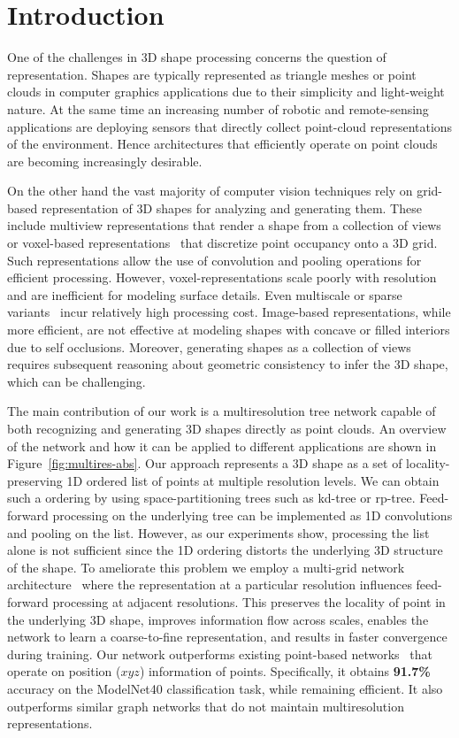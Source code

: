 \section{Introduction}
One of the challenges in 3D shape processing concerns the question of representation.
Shapes are typically represented as triangle meshes or point clouds in computer graphics applications due to their simplicity and light-weight nature.
At the same time an increasing number of robotic and remote-sensing applications are deploying sensors that directly collect point-cloud representations of the environment. Hence architectures that efficiently operate on point clouds are becoming increasingly desirable.

On the other hand the vast majority of computer vision techniques rely on grid-based representation of 3D shapes for analyzing and generating them. 
These include multiview representations that render a shape from a collection of views~\cite{qi2016volumetric,mvcnn,Soltani17} or voxel-based representations~\cite{wu20153d,Huang:PCL,voxnet,BrockLRW16,3dgan} that discretize point occupancy onto a 3D grid. 
Such representations allow the use of convolution and pooling operations for efficient processing. 
However, voxel-representations scale poorly with resolution and are inefficient for modeling surface details.
Even multiscale or sparse variants~\cite{fpnn,Riegler2017CVPR,hie3dcnn} incur relatively high processing cost.
Image-based representations, while more efficient, are not effective at modeling shapes with concave or filled interiors due to self occlusions.
Moreover, generating shapes as a collection of views requires subsequent reasoning about geometric consistency to infer the 3D shape, which can be challenging.


The main contribution of our work is a multiresolution tree network capable of both recognizing and generating 3D shapes directly as point clouds.
An overview of the network and how it can be applied to different applications are shown in Figure~\ref{fig:multires-abs}.
Our approach represents a 3D shape as a set of locality-preserving 1D ordered list of points at multiple resolution levels. 
We can obtain such a ordering by using space-partitioning trees such as kd-tree or rp-tree.
Feed-forward processing on the underlying tree can be implemented as 1D convolutions and pooling on the list.
However, as our experiments show, processing the list alone is not sufficient since the 1D ordering distorts the underlying 3D structure of the shape. 
To ameliorate this problem we employ a multi-grid network architecture~\cite{multigrid} where the representation at a particular resolution influences feed-forward processing at adjacent resolutions.
This preserves the locality of point in the underlying 3D shape, improves information flow across scales, enables the network to learn a coarse-to-fine representation, and results in faster convergence during training.
Our network outperforms existing point-based networks~\cite{pointnet,Klokov_2017_ICCV,pointnet2} that operate on position ($xyz$) information of points. Specifically, it obtains \textbf{91.7\%} accuracy on the ModelNet40 classification task,
while remaining efficient.
It also outperforms similar graph networks that do not maintain multiresolution representations.

